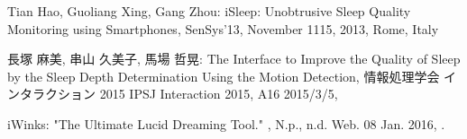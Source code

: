 \begin{bib}[100]
\begin{flushleft}
  Tian Hao, Guoliang Xing, Gang Zhou:
  \newblock  iSleep: Unobtrusive Sleep Quality Monitoring using Smartphones,
  \newblock SenSys’13,
  \newblock  November 1115, 2013, Rome, Italy
\end{flushleft}

\begin{flushleft}
  長塚 麻美, 串山 久美子, 馬場 哲晃:
  \newblock  The Interface to Improve the Quality of Sleep by the Sleep Depth Determination Using the Motion Detection,
  \newblock 情報処理学会 インタラクション 2015 IPSJ Interaction 2015,
  \newblock  A16 2015/3/5,
\end{flushleft}

\begin{flushleft}
iWinks:
 \newblock  "The Ultimate Lucid Dreaming Tool." ,
  \newblock N.p., n.d. Web. 08 Jan. 2016,
  .
\end{flushleft}

\end{bib}